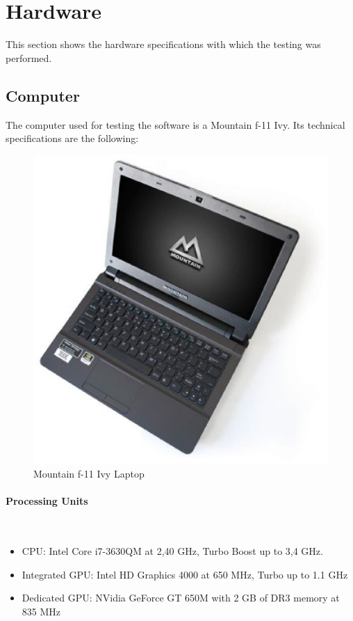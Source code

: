 \section{Hardware }
This section shows the hardware specifications with which the testing was performed. 

\subsection{Computer}
	The computer used for testing the software is a Mountain f-11 Ivy. Its technical specifications are the following: 

	\begin{figure}[H]
		\begin{center}
	\includegraphics[scale=0.3]{img/mountain.eps}
		\caption[Mountain laptop]{Mountain f-11 Ivy Laptop}
		\end{center}
	\end{figure}

	\paragraph{Processing Units} \mbox{}\\
		\begin{itemize}
			\item{CPU: Intel Core i7-3630QM at 2,40 GHz, Turbo Boost up to 3,4 GHz.}
			\item{Integrated GPU:  Intel HD Graphics 4000 at 650 MHz,  Turbo up to 1.1 GHz }
			\item{Dedicated GPU: NVidia GeForce GT 650M with 2 GB of DR3 memory at 835 MHz }
		\end{itemize}

